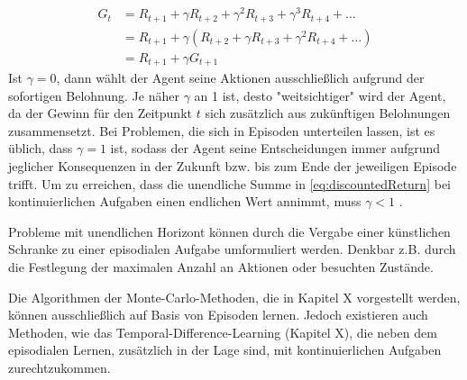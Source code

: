 \begin{equation}\label{eq:successiveReturn}
    \begin{aligned}
    G_t &= R_{t+1} + \gamma R_{t+2} + \gamma^2 R_{t+3} + \gamma^3 R_{t+4} + \dots \\
    &= R_{t+1} + \gamma (R_{t+2} + \gamma R_{t+3} + \gamma^2 R_{t+4} + \dots)  \\
   & = R_{t+1} + \gamma G_{t+1}
    \end{aligned}
\end{equation}
Ist $\gamma = 0$, dann wählt der Agent seine Aktionen ausschließlich aufgrund der sofortigen Belohnung. Je näher $\gamma$ an 1 ist, desto "weitsichtiger" wird der Agent, da der Gewinn für den Zeitpunkt $t$ sich zusätzlich aus zukünftigen Belohnungen zusammensetzt. Bei Problemen, die sich in Episoden unterteilen lassen, ist es üblich, dass $\gamma = 1$ ist, sodass der Agent seine Entscheidungen immer aufgrund jeglicher Konsequenzen in der Zukunft bzw. bis zum Ende der jeweiligen Episode trifft. Um zu erreichen, dass die unendliche Summe in \eqref{eq:discountedReturn} bei kontinuierlichen Aufgaben einen endlichen Wert annimmt, muss $\gamma < 1$ \cite[S.55]{Sutton1998}. 
\par 
Probleme mit unendlichen Horizont können durch die Vergabe einer künstlichen Schranke zu einer episodialen Aufgabe umformuliert werden. Denkbar z.B. durch die Festlegung der maximalen Anzahl an Aktionen oder besuchten Zustände. 
\par 
Die Algorithmen der Monte-Carlo-Methoden, die in Kapitel X vorgestellt werden, können ausschließlich auf Basis von Episoden lernen. Jedoch existieren auch Methoden, wie das Temporal-Difference-Learning (Kapitel X), die neben dem episodialen Lernen, zusätzlich in der Lage sind, mit kontinuierlichen Aufgaben zurechtzukommen. 